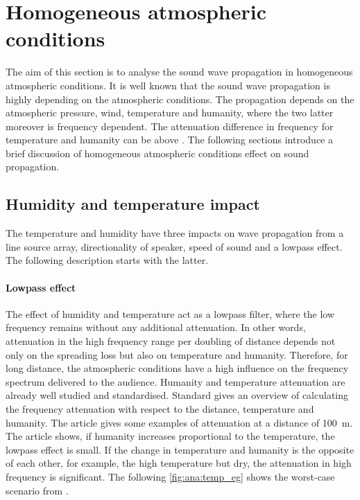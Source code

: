 \section{Homogeneous atmospheric conditions}\label{sec:ana:hom_ats_con}
The aim of this section is to analyse the sound wave propagation in homogeneous atmospheric conditions. It is well known that the sound wave propagation is highly depending on the atmospheric conditions. The propagation depends on the atmospheric pressure, wind, temperature and humanity, where the two latter moreover is frequency dependent. The attenuation difference in frequency for temperature and humanity can be above  \citep{corteel2017large}. The following sections introduce a brief discussion of homogeneous atmospheric conditions effect on sound propagation.


\subsection{Humidity and temperature impact}\label{sec:ana:hu_temp}
The temperature and humidity have three impacts on wave propagation from a line source array, directionality of speaker, speed of sound and a lowpass effect. The following description starts with the latter. 

\paragraph{Lowpass effect} The effect of humidity and temperature act as a lowpass filter, where the low frequency remains without any additional attenuation. In other words, attenuation in the high frequency range per doubling of distance depends not only on the spreading loss but also on temperature and humanity. Therefore, for long distance, the atmospheric conditions have a high influence on the frequency spectrum delivered to the audience. Humanity and temperature attenuation are already well studied and standardised. Standard \citep{iso_9613-1} gives an overview of calculating the frequency attenuation with respect to the distance, temperature and humanity. The article \citep{corteel2017large} gives some examples of attenuation at a distance of \SI{100}{\meter}. The article shows, if humanity increases proportional to the temperature, the lowpass effect is small. If the change in temperature and humanity is the opposite of each other, for example, the high temperature but dry, the attenuation in high frequency is significant. The following \autoref{fig:ana:temp_eg} shows the worst-case scenario from \citep{corteel2017large}.

